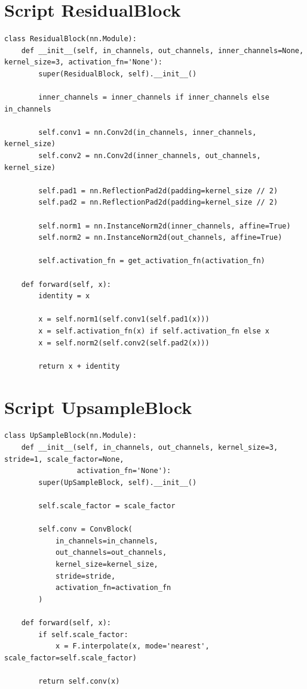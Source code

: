 \section{Script ResidualBlock}
\label{sec:script_residual_block}
\begin{longlisting}
\begin{verbatim}
class ResidualBlock(nn.Module):
    def __init__(self, in_channels, out_channels, inner_channels=None, kernel_size=3, activation_fn='None'):
        super(ResidualBlock, self).__init__()

        inner_channels = inner_channels if inner_channels else in_channels

        self.conv1 = nn.Conv2d(in_channels, inner_channels, kernel_size)
        self.conv2 = nn.Conv2d(inner_channels, out_channels, kernel_size)

        self.pad1 = nn.ReflectionPad2d(padding=kernel_size // 2)
        self.pad2 = nn.ReflectionPad2d(padding=kernel_size // 2)

        self.norm1 = nn.InstanceNorm2d(inner_channels, affine=True)
        self.norm2 = nn.InstanceNorm2d(out_channels, affine=True)

        self.activation_fn = get_activation_fn(activation_fn)

    def forward(self, x):
        identity = x

        x = self.norm1(self.conv1(self.pad1(x)))
        x = self.activation_fn(x) if self.activation_fn else x
        x = self.norm2(self.conv2(self.pad2(x)))

        return x + identity
\end{verbatim}
\label{lst:script_residual_block}
\end{longlisting}

\section{Script UpsampleBlock}
\label{sec:script_upsample_block}
\begin{longlisting}
\begin{verbatim}
class UpSampleBlock(nn.Module):
    def __init__(self, in_channels, out_channels, kernel_size=3, stride=1, scale_factor=None,
                 activation_fn='None'):
        super(UpSampleBlock, self).__init__()

        self.scale_factor = scale_factor

        self.conv = ConvBlock(
            in_channels=in_channels,
            out_channels=out_channels,
            kernel_size=kernel_size,
            stride=stride,
            activation_fn=activation_fn
        )

    def forward(self, x):
        if self.scale_factor:
            x = F.interpolate(x, mode='nearest', scale_factor=self.scale_factor)

        return self.conv(x)
\end{verbatim}
\label{lst:script_upsample_block}
\end{longlisting}

